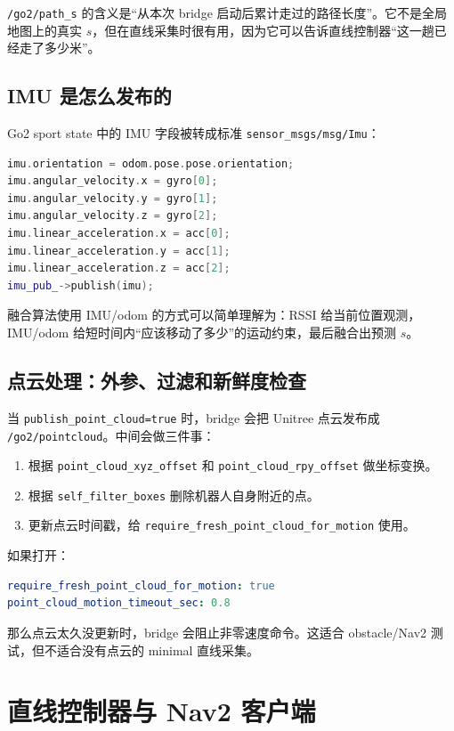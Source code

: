 \documentclass[UTF8,11pt,a4paper,openany]{ctexrep}
\newcommand{\topic}[1]{\nolinkurl{#1}}
\newcommand{\msg}[1]{\nolinkurl{#1}}
\newcommand{\param}[1]{\nolinkurl{#1}}
\begin{document}
\topic{/go2/path_s} 的含义是“从本次 bridge 启动后累计走过的路径长度”。它不是全局地图上的真实 \(s\)，但在直线采集时很有用，因为它可以告诉直线控制器“这一趟已经走了多少米”。

\section{IMU 是怎么发布的}

Go2 sport state 中的 IMU 字段被转成标准 \msg{sensor_msgs/msg/Imu}：

\begin{lstlisting}[language=cpp]
imu.orientation = odom.pose.pose.orientation;
imu.angular_velocity.x = gyro[0];
imu.angular_velocity.y = gyro[1];
imu.angular_velocity.z = gyro[2];
imu.linear_acceleration.x = acc[0];
imu.linear_acceleration.y = acc[1];
imu.linear_acceleration.z = acc[2];
imu_pub_->publish(imu);
\end{lstlisting}

融合算法使用 IMU/odom 的方式可以简单理解为：RSSI 给当前位置观测，IMU/odom 给短时间内“应该移动了多少”的运动约束，最后融合出预测 \(s\)。

\section{点云处理：外参、过滤和新鲜度检查}

当 \param{publish_point_cloud=true} 时，bridge 会把 Unitree 点云发布成 \topic{/go2/pointcloud}。中间会做三件事：

\begin{enumerate}
  \item 根据 \param{point_cloud_xyz_offset} 和 \param{point_cloud_rpy_offset} 做坐标变换。
  \item 根据 \param{self_filter_boxes} 删除机器人自身附近的点。
  \item 更新点云时间戳，给 \param{require_fresh_point_cloud_for_motion} 使用。
\end{enumerate}

如果打开：

\begin{lstlisting}[language=yaml]
require_fresh_point_cloud_for_motion: true
point_cloud_motion_timeout_sec: 0.8
\end{lstlisting}

那么点云太久没更新时，bridge 会阻止非零速度命令。这适合 obstacle/Nav2 测试，但不适合没有点云的 minimal 直线采集。

\chapter{直线控制器与 Nav2 客户端}
\end{document}
